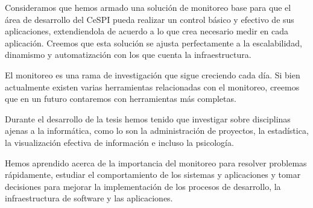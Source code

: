 Consideramos que hemos armado una solución de monitoreo base para que el área de desarrollo del CeSPI pueda realizar un control básico y efectivo de sus aplicaciones, extendiendola de acuerdo a lo que crea necesario medir en cada aplicación. Creemos que esta solución se ajusta perfectamente a la escalabilidad, dinamismo y automatización con los que cuenta la infraestructura.

El monitoreo es una rama de investigación que sigue creciendo cada día. Si bien actualmente existen varias herramientas relacionadas con el monitoreo, creemos que en un futuro contaremos con herramientas más completas.

Durante el desarrollo de la tesis hemos tenido que investigar sobre disciplinas ajenas a la informática, como lo son la administración de proyectos, la estadística, la visualización efectiva de información e incluso la psicología.

Hemos aprendido acerca de la importancia del monitoreo para resolver problemas rápidamente, estudiar el comportamiento de los sistemas y aplicaciones y tomar decisiones para mejorar la implementación de los procesos de desarrollo, la infraestructura de software y las aplicaciones.
